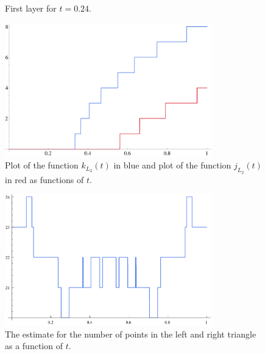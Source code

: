 \documentclass{beamer}
\begin{document}
\begin{frame}
\begin{figure}[!h]
\begin{center}
\resizebox{9cm}{!}{%

}
\end{center}
\caption{First layer for $t = 0.24.$}
\end{figure}
\end{frame}

\begin{frame}
\begin{figure}[t]
\begin{center}
\includegraphics[width=0.8\textwidth]{./figures/plot-kL2-jL2-large.pdf}
\end{center}
\caption{Plot of the function $k_{L_{2}}(t)$ in blue and plot of the function $j_{L_{2}}(t)$ in red as functions of $t$.}
\end{figure}
\end{frame}

\begin{frame}
\begin{figure}[t]
\centering
\includegraphics[width=0.8\textwidth]{./figures/left-and-right-layers-estimates-small.pdf}
\caption{The estimate for the number of points in the left and right triangle as a function of $t$.}
\end{figure}
\end{frame}
\end{document}
